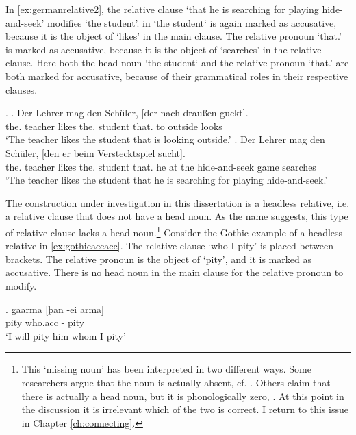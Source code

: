 In \ref{ex:germanrelative2},  the relative clause  `that he is searching for playing hide-and-seek' modifies  `the student'.  in  `the student` is again marked as accusative, because it is the object of  `likes' in the main clause. The relative pronoun  `that.' is marked as accusative, because it is the object of  `searches' in the relative clause. Here both the head noun  `the student` and the relative pronoun  `that.' are both marked for accusative, because of their grammatical roles in their respective clauses.

\ex.\label{ex:germanrelatives}
\ag. Der Lehrer mag den Schüler, [der nach draußen guckt].\\
 the. teacher likes the. student that. to outside looks\\
 `The teacher likes the student that is looking outside.'\label{ex:germanrelative1}
 \bg. Der Lehrer mag den Schüler, [den er beim Verstecktspiel sucht].\\
 the. teacher likes the. student that. he {at the} {hide-and-seek game} searches\\
 `The teacher likes the student that he is searching for playing hide-and-seek.'\label{ex:germanrelative2}

The construction under investigation in this dissertation is a headless relative, i.e. a relative clause that does not have a head noun. As the name suggests, this type of relative clause lacks a head noun.\footnote{
This `missing noun' has been interpreted in two different ways. Some researchers argue that the noun is actually absent, cf. \citealt{vanriemsdijk2006}. Others claim that there is actually a head noun, but it is phonologically zero, \citealt{himmelreich2017}. At this point in the discussion it is irrelevant which of the two is correct. I return to this issue in Chapter \ref{ch:connecting}.
}
Consider the Gothic example of a headless relative in \ref{ex:gothicaccacc}.
The relative clause  `who I pity' is placed between brackets. The relative pronoun is the object of  `pity', and it is marked as accusative. There is no head noun in the main clause for the relative pronoun to modify.

\exg. gaarma [þan -ei arma]\\
 pity\scsub{[acc]} who.\ac{acc} - pity\scsub{[acc]}\\
 `I will pity him whom I pity' \label{ex:gothicaccacc}

